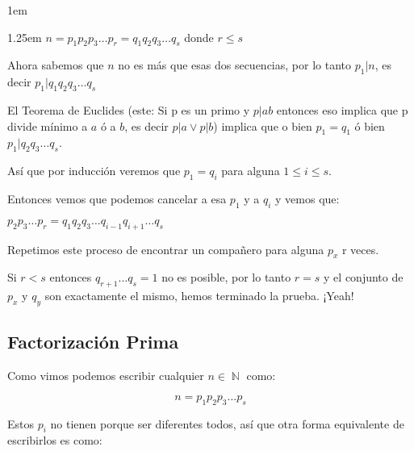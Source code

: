 \documentclass[12pt, fleqn]{report}                             %
\newenvironment{Indentation}[1][0.75em]                         %
    {\begin{adjustwidth}{#1}{}}                                     %
    {\end{adjustwidth}}                                             %
\newenvironment{SmallIndentation}[1][0.75em]                    %
    {\begin{adjustwidth}{#1}{}\begin{footnotesize}}                 %
    {\end{footnotesize}\end{adjustwidth}}                           %
\DeclareMathOperator \Naturals  {\mathbb{N}}                     %
\begin{document}
\begin{SmallIndentation}[1em]
\begin{Indentation}[1.25em]
                $n=p_1p_2p_3\dots p_r = q_1q_2q_3\dots q_s$ donde $r \leq s$

                Ahora sabemos que $n$ no es más que esas dos secuencias, por 
                lo tanto $p_1|n$, es decir $p_1|q_1q_2q_3\dots q_s$

                El Teorema de Euclides (este: Si p es un primo y $p|ab$ entonces
                eso implica que p divide mínimo a $a$ ó a $b$, es decir
                $p|a \lor p|b$) implica que o bien $p_1=q_1$ ó bien
                $p_1|q_2q_3\dots q_s$.

                Así que por inducción veremos que $p_1=q_i$ para alguna
                $1 \leq i \leq s$.

                Entonces vemos que podemos cancelar a esa $p_1$ y a $q_i$ y vemos
                que:

                $p_2p_3\dots p_r = q_1q_2q_3\dots q_{i-1}q_{i+1} \dots q_s$

                Repetimos este proceso de encontrar un compañero para alguna $p_x$
                r veces.

                Si $r < s$ entonces $q_{r+1} \dots q_s = 1$ no es posible,
                por lo tanto $r=s$ y el conjunto de $p_x$ y $q_y$ son exactamente
                el mismo, hemos terminado la prueba. ¡Yeah!



            \end{Indentation}
            
        \end{SmallIndentation}



        \clearpage
        \subsection{Factorización Prima}

            Como vimos podemos escribir cualquier $n \in \Naturals$ como:

            \begin{equation}
                n = p_1 p_2 p_3 \dots p_s
            \end{equation}

            Estos $p_i$ no tienen porque ser diferentes todos, así que 
            otra forma equivalente de escribirlos es como:
\end{document}
